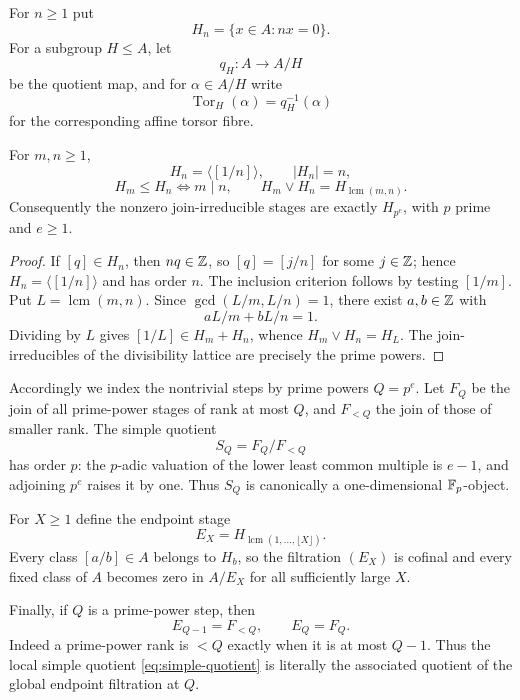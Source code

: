 For $n\ge1$ put
\[
H_n=\{x\in A:nx=0\}.
\]
For a subgroup $H\le A$, let
\[
q_H:A\longrightarrow A/H
\]
be the quotient map, and for $\alpha\in A/H$ write
\[
\operatorname{Tor}_H(\alpha)=q_H^{-1}(\alpha)
\]
for the corresponding affine torsor fibre.

\begin{lemma}\label{lem:torsion-filtration}
For $m,n\ge1$,
\[
H_n=\langle[1/n]\rangle,
\qquad |H_n|=n,
\]
\[
H_m\le H_n\iff m\mid n,
\qquad
H_m\vee H_n=H_{\operatorname{lcm}(m,n)}.
\]
Consequently the nonzero join-irreducible stages are exactly $H_{p^e}$, with $p$ prime and $e\ge1$.
\end{lemma}

\begin{proof}
If $[q]\in H_n$, then $nq\in\mathbb Z$, so $[q]=[j/n]$ for some $j\in\mathbb Z$; hence $H_n=\langle[1/n]\rangle$ and has order $n$.  The inclusion criterion follows by testing $[1/m]$.  Put $L=\operatorname{lcm}(m,n)$.  Since $\gcd(L/m,L/n)=1$, there exist $a,b\in\mathbb Z$ with
\[
aL/m+bL/n=1.
\]
Dividing by $L$ gives $[1/L]\in H_m+H_n$, whence $H_m\vee H_n=H_L$.  The join-irreducibles of the divisibility lattice are precisely the prime powers.
\end{proof}

Accordingly we index the nontrivial steps by prime powers $Q=p^e$.  Let $F_Q$ be the join of all prime-power stages of rank at most $Q$, and $F_{<Q}$ the join of those of smaller rank.  The simple quotient
\begin{equation}\label{eq:simple-quotient}
S_Q=F_Q/F_{<Q}
\end{equation}
has order $p$: the $p$-adic valuation of the lower least common multiple is $e-1$, and adjoining $p^e$ raises it by one.  Thus $S_Q$ is canonically a one-dimensional $\mathbb F_p$-object.

For $X\ge1$ define the endpoint stage
\begin{equation}\label{eq:endpoint-stage}
E_X=H_{\operatorname{lcm}(1,\ldots,\lfloor X\rfloor)}.
\end{equation}
Every class $[a/b]\in A$ belongs to $H_b$, so the filtration $(E_X)$ is cofinal and every fixed class of $A$ becomes zero in $A/E_X$ for all sufficiently large $X$.

Finally, if $Q$ is a prime-power step, then
\begin{equation}\label{eq:endpoint-current-step}
E_{Q-1}=F_{<Q},
\qquad
E_Q=F_Q.
\end{equation}
Indeed a prime-power rank is $<Q$ exactly when it is at most $Q-1$.  Thus the local simple quotient \eqref{eq:simple-quotient} is literally the associated quotient of the global endpoint filtration at $Q$.
